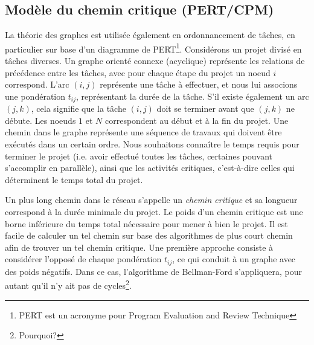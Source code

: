 \subsection{Modèle du chemin critique (PERT/CPM)}

La théorie des graphes est utilisée également en ordonnancement de tâches, en particulier sur base d'un diagramme de PERT\footnote{PERT est un acronyme pour Program Evaluation and Review Technique}.
Considérons un projet divisé en tâches diverses.
Un graphe orienté connexe (acyclique) représente les relations de précédence entre les tâches, avec pour chaque étape du projet un noeud $i$ correspond.
L'arc $(i,j)$ représente une tâche à effectuer, et nous lui associons une pondération $t_{ij}$, représentant la durée de la tâche.
S'il existe également un arc $(j,k)$, cela signifie que la tâche $(i,j)$ doit se terminer avant que $(j,k)$ ne débute.
Les noeuds $1$ et $N$ correspondent au début et à la fin du projet.
Une chemin dans le graphe représente une séquence de travaux qui doivent être exécutés dans un certain ordre.
Nous souhaitons connaître le temps requis pour terminer le projet (i.e. avoir effectué toutes les tâches, certaines pouvant s'accomplir en parallèle), ainsi que les activités critiques, c'est-à-dire celles qui déterminent le temps total du projet.

Un plus long chemin dans le réseau s'appelle un {\sl chemin critique} et sa longueur correspond à la durée minimale du projet.
Le poids d'un chemin critique est une borne inférieure du temps total nécessaire pour mener à bien le projet.
 Il est facile de calculer un tel chemin sur base des algorithmes de plus court chemin afin de trouver un tel chemin critique.
Une première approche consiste à considérer l'opposé de chaque pondération $t_{ij}$, ce qui conduit à un graphe avec des poids négatifs.
Dans ce cas, l'algorithme de Bellman-Ford s'appliquera, pour autant qu'il n'y ait pas de cycles\footnote{Pourquoi?}.

